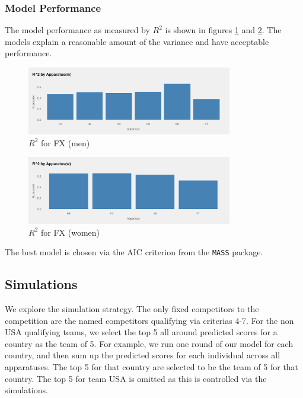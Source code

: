 \documentclass{article}
\begin{document}
\subsubsection{Model Performance}
The model performance as measured by $R^2$ is shown in figures \ref{fig:m_r2}
and \ref{fig:w_r2}. The models explain a reasonable amount of the variance and 
have acceptable performance.

\begin{figure}[H]
    \centering
    \includegraphics[width=0.8\textwidth]{../plots/m_r2.png}
    \caption{$R^2$ for FX (men)}
    \label{fig:m_r2}
\end{figure}

\begin{figure}[H]
    \centering
    \includegraphics[width=0.8\textwidth]{../plots/w_r2.png}
    \caption{$R^2$ for FX (women)}
    \label{fig:w_r2}
\end{figure}
\noindent The best model is chosen via the AIC criterion from the \texttt{MASS} package.

\subsection{Simulations}

We explore the simulation strategy. The only fixed competitors to the competition 
are the named competitors qualifying via criterias 4-7. For the non USA qualifying teams, 
we select the top 5 all around predicted scores for a country as the team of 5. For example, 
we run one round of our model for each country, and then sum up the predicted scores 
for each individual across all apparatuses. The top 5 for that country are selected to 
be the team of 5 for that country. The top 5 for team USA is omitted as this 
is controlled via the simulations.
\end{document}
